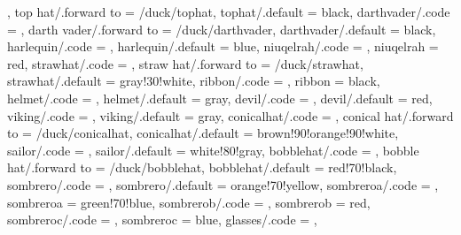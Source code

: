 {                              \def\duck@tophat{#1},
  top hat/.forward to       = /duck/tophat,
  tophat/.default           = black,
  darthvader/.code          = \duck@darthvadertrue  
                              \def\duck@darthvader{#1},
  darth vader/.forward to   = /duck/darthvader,
  darthvader/.default       = black,
  harlequin/.code           = \duck@harlequintrue   
                              \def\duck@harlequin{#1},
  harlequin/.default        = blue,
  niuqelrah/.code           = \def\duck@niuqelrah{#1},
  niuqelrah                 = red,
  strawhat/.code            = \duck@strawhattrue    
                              \def\duck@strawhat{#1},
  straw hat/.forward to     = /duck/strawhat,
  strawhat/.default         = gray!30!white,
  ribbon/.code              = \def\duck@ribbon{#1},
  ribbon                    = black,
  helmet/.code              = \duck@helmettrue      
                              \def\duck@helmet{#1},
  helmet/.default           = gray,
  devil/.code               = \duck@deviltrue
                              \def\duck@devil{#1},
  devil/.default            = red,
  viking/.code              = \duck@vikingtrue      
                              \def\duck@viking{#1}
                              \duck@deviltrue
                              \def\duck@devil{brown!20!white},
  viking/.default           = gray,  
  conicalhat/.code          = \duck@conicalhattrue
                              \def\duck@conicalhat{#1},
  conical hat/.forward to   = /duck/conicalhat,                  
  conicalhat/.default       = brown!90!orange!90!white,
  sailor/.code              = \duck@sailortrue
                              \def\duck@sailor{#1},
  sailor/.default           = white!80!gray,
  bobblehat/.code           = \duck@bobblehattrue
                              \def\duck@bobblehat{#1},
  bobble hat/.forward to    = /duck/bobblehat,
  bobblehat/.default        = red!70!black, 
  sombrero/.code            = \duck@sombrerotrue
                              \def\duck@sombrero{#1},
  sombrero/.default         = orange!70!yellow,
  sombreroa/.code           = \def\duck@sombreroa{#1},
  sombreroa                 = green!70!blue,
  sombrerob/.code           = \def\duck@sombrerob{#1},
  sombrerob                 = red,
  sombreroc/.code           = \def\duck@sombreroc{#1},
  sombreroc                 = blue,      
  glasses/.code             = \duck@glassestrue     
                              \def\duck@glasses{#1},
}
